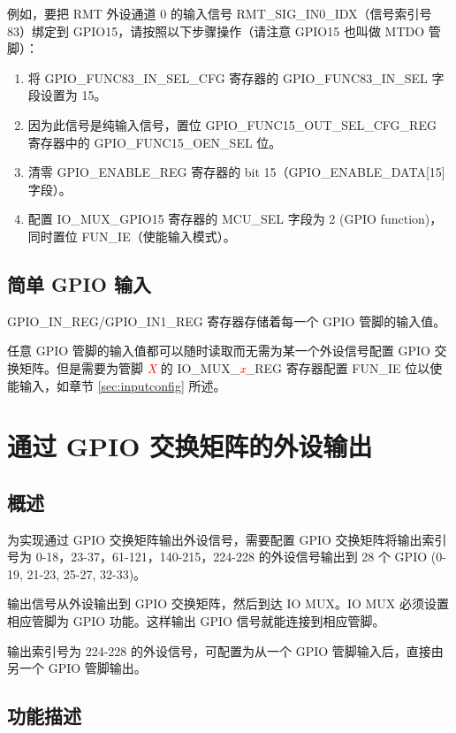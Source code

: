 \documentclass[main\_\_CN.tex]{subfiles}
\begin{document}
例如，要把 RMT 外设通道 0 的输入信号 RMT\_SIG\_IN0\_IDX（信号索引号 83）绑定到 GPIO15，请按照以下步骤操作（请注意  GPIO15 也叫做 MTDO 管脚）：
\begin{enumerate}
\item 将 GPIO\_FUNC83\_IN\_SEL\_CFG 寄存器的 GPIO\_FUNC83\_IN\_SEL 字段设置为 15。
\item 因为此信号是纯输入信号，置位 GPIO\_FUNC15\_OUT\_SEL\_CFG\_REG  寄存器中的 GPIO\_FUNC15\_OEN\_SEL 位。
\item 清零 GPIO\_ENABLE\_REG 寄存器的 bit 15（GPIO\_ENABLE\_DATA[15] 字段）。
\item 配置 IO\_MUX\_GPIO15 寄存器的 MCU\_SEL 字段为 2 (GPIO function)，同时置位 FUN\_IE（使能输入模式）。
\end{enumerate}

\subsection{简单 GPIO 输入}\label{IOMUXSimpleGPIOInput}

GPIO\_IN\_REG/GPIO\_IN1\_REG 寄存器存储着每一个 GPIO 管脚的输入值。

任意 GPIO 管脚的输入值都可以随时读取而无需为某一个外设信号配置 GPIO 交换矩阵。但是需要为管脚 \textcolor{red}{\it{X}} 的 IO\_MUX\_\textcolor{red}{\it{x}}\_REG 寄存器配置 FUN\_IE 位以使能输入，如章节 \ref{sec:inputconfig} 所述。

\section{通过 GPIO 交换矩阵的外设输出}

\subsection{概述}

为实现通过 GPIO 交换矩阵输出外设信号，需要配置 GPIO 交换矩阵将输出索引号为 0-18，23-37，61-121，140-215，224-228 的外设信号输出到 28 个 GPIO (0-19, 21-23, 25-27, 32-33)。

输出信号从外设输出到 GPIO 交换矩阵，然后到达 IO MUX。IO MUX 必须设置相应管脚为 GPIO 功能。这样输出 GPIO 信号就能连接到相应管脚。

\begin{tiplisting}
输出索引号为 224-228 的外设信号，可配置为从一个 GPIO 管脚输入后，直接由另一个 GPIO 管脚输出。
\end{tiplisting}
\vspace{-2em}
\subsection{功能描述}\label{IOMUXPeripheralOutput}
\end{document}
